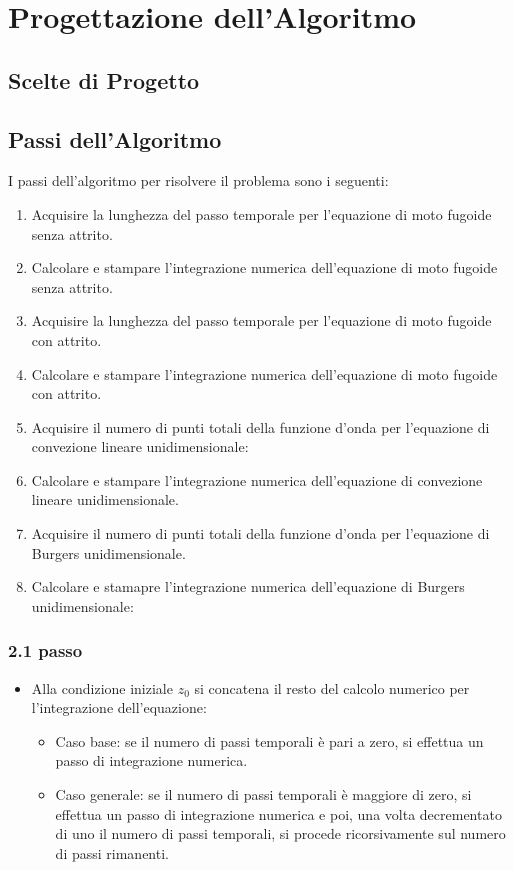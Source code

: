 \section{Progettazione dell'Algoritmo}
\subsection{Scelte di Progetto}

\subsection{Passi dell'Algoritmo}
I passi dell'algoritmo per risolvere il problema sono i seguenti:

\begin{enumerate}
\item Acquisire la lunghezza del passo temporale per l'equazione di moto fugoide senza attrito.
\item Calcolare e stampare l'integrazione numerica dell'equazione di moto fugoide senza attrito.
\item Acquisire la lunghezza del passo temporale per l'equazione di moto fugoide con attrito.
\item Calcolare e stampare l'integrazione numerica dell'equazione di moto fugoide con attrito.
\item Acquisire il numero di punti totali della funzione d'onda per l'equazione di convezione lineare unidimensionale:
\item Calcolare e stampare l'integrazione numerica dell'equazione di convezione lineare unidimensionale.
\item Acquisire il numero di punti totali della funzione d'onda per l'equazione di Burgers unidimensionale.
\item Calcolare e stamapre l'integrazione numerica dell'equazione di Burgers unidimensionale:
\end{enumerate}

\subsubsection*{2.1 passo}
\begin{itemize}
\item Alla condizione iniziale $z_0$ si concatena il resto del calcolo numerico per l'integrazione dell'equazione:
\begin{itemize}
\item Caso base: se il numero di passi temporali è pari a zero, si effettua un passo di integrazione numerica.
\item Caso generale: se il numero di passi temporali è maggiore di zero, si effettua un passo di integrazione numerica e poi, una volta decrementato di uno il numero di passi temporali, si procede ricorsivamente sul numero di passi rimanenti. 
\end{itemize}
\end{itemize}

